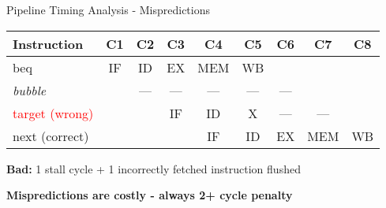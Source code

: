 \documentclass[aspectratio=169,12pt]{beamer}
\begin{document}
\begin{frame}{Pipeline Timing Analysis - Mispredictions}
\begin{center}
{\begin{minipage}{0.95\textwidth}
\begin{tabular}{l|c|c|c|c|c|c|c|c}
\textbf{Instruction} & \textbf{C1} & \textbf{C2} & \textbf{C3} & \textbf{C4} & \textbf{C5} & \textbf{C6} & \textbf{C7} & \textbf{C8} \\
\hline
beq & \cellcolor{normalexec!40}IF & \cellcolor{normalexec!40}ID & \cellcolor{normalexec!40}EX & \cellcolor{normalexec!40}MEM & \cellcolor{normalexec!40}WB & & & \\
\textit{bubble} & & \cellcolor{stallcolor!40}--- & \cellcolor{emptycolor}--- & \cellcolor{emptycolor}--- & \cellcolor{emptycolor}--- & \cellcolor{emptycolor}--- & & \\
\textcolor{red}{target (wrong)} & & & \cellcolor{normalexec!40}IF & \cellcolor{flushcolor!40}ID & \cellcolor{flushcolor!40}\textsf{X} & \cellcolor{emptycolor}--- & \cellcolor{emptycolor}--- & \\
next (correct) & & & & \cellcolor{normalexec!40}IF & \cellcolor{normalexec!40}ID & \cellcolor{normalexec!40}EX & \cellcolor{normalexec!40}MEM & \cellcolor{normalexec!40}WB \\
\end{tabular}

\vspace{0.05cm}
\footnotesize \textbf{Bad:} 1 stall cycle + 1 incorrectly fetched instruction flushed
\end{minipage}
}
\end{center}

\vspace{0.1cm}


\begin{center}
\large
\textcolor{red!70!black}{\textbf{Mispredictions are costly - always 2+ cycle penalty}}
\end{center}

\end{frame}
\end{document}
